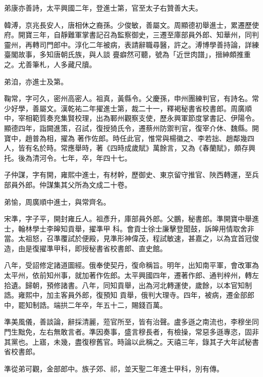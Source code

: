 \begin{pinyinscope}
 弟康亦善詩，太平興國二年，登進士第，官至太子右贊善大夫。



 韓溥，京兆長安人，唐相休之裔孫。少俊敏，善屬文。周顯德初舉進士，累遷歷使府。開寶三年，自靜難軍掌書記召為監察御史，三遷至庫部員外郎、知華州，同判靈州，再轉司門郎中。淳化二年被病，表請辭職尋醫，許之。溥博學善持論，詳練臺閣故事，多知唐朝氏族，與人談
 亹癖然可聽，號為「近世肉譜」，搢紳頗推重之。尤善筆札，人多藏尺牘。



 弟洎，亦進士及第。



 鞠常，字可久，密州高密人。祖真，黃縣令。父慶孫，申州團練判官，有詩名。常少好學，善屬文。漢乾祐二年擢進士第，裁二十一，釋褐秘書省校書郎。周廣順中，宰相範質奏充集賢校理，出為鄆州觀察支使，歷永興軍節度掌書記、伊陽令。顯德四年，詣闕進策，召試，復授猗氏令，遷蔡州防禦判官，復宰介休、魏縣。開寶中，趙普為相，擢為
 著作佐郎。時任此官，惟常與楊徽之、李若拙、趙鄰幾四人，皆有名於時。常應舉時，著《四時成歲賦》萬餘言，又為《春蘭賦》，頗存興托。後為清河令。七年，卒，年四十七。



 子仲謀，字有開，雍熙中進士，有材幹，歷御史、東京留守推官、陜西轉運，至兵部員外郎。仲謀集其父所為文成二十卷。



 弟愉，周廣順中進士，與常齊名。



 宋準，字子平，開封雍丘人。祖彥升，庫部員外郎。父鵬，秘書郎。準開寶中舉進士，翰林學士李皞知貢舉，擢準甲
 科。會貢士徐士廉擊登聞鼓，訴皞用情取舍非當。太祖怒，召準覆試於便殿，見準形神偉茂，程試敏速，甚嘉之，以為宜首冠俊造，由是復擢準甲科，即授秘書省校書郎、直史館。



 八年，受詔修定諸道圖經。俄奉使契丹，復命稱旨。明年，出知南平軍，會改軍為太平州，依前知州事，就加著作佐郎。太平興國四年，遷著作郎、通判梓州，轉左拾遺。歸朝，預修諸書。八年，同知貢舉，出為河北轉運使，歲餘，以本官知制誥。雍熙中，加主客員外郎，復預知
 貢舉，俄判大理寺。四年，被病，遷金部郎中，罷知制誥。端拱二年卒，年五十二，賜錢百萬。



 準美風儀，善談論，辭採清麗，蒞官所至，皆有治聲。盧多遜之南流也，李穆坐同門生黜免，左右無敢言者。準因奏事，盛言穆長者，有檢操，常惡多遜專恣，固非其黨也。上寤，未幾，盡復穆舊官。時論以此稱之。天禧三年，錄其子大年試秘書省校書郎。



 準從弟可觀，金部郎中。族子郊、祁，並天聖二年進士甲科，別有傳。




\end{pinyinscope}

